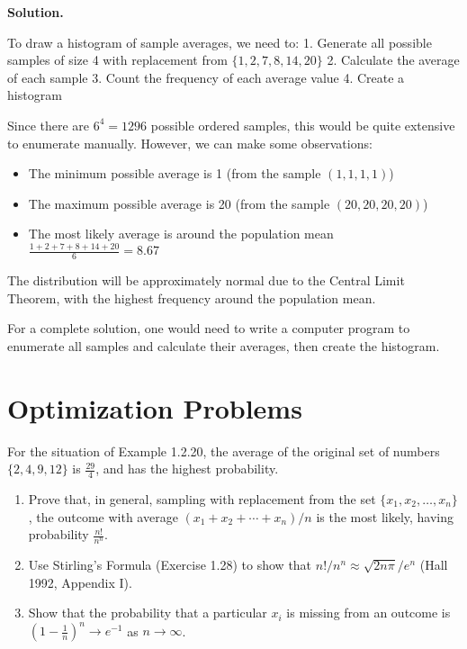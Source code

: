 \noindent\textbf{Solution.}

To draw a histogram of sample averages, we need to:
1. Generate all possible samples of size 4 with replacement from $\{1,2,7,8,14,20\}$
2. Calculate the average of each sample
3. Count the frequency of each average value
4. Create a histogram

Since there are $6^4 = 1296$ possible ordered samples, this would be quite extensive to enumerate manually. However, we can make some observations:

\begin{itemize}
\item The minimum possible average is 1 (from the sample $(1,1,1,1)$)
\item The maximum possible average is 20 (from the sample $(20,20,20,20)$)
\item The most likely average is around the population mean $\frac{1+2+7+8+14+20}{6} = 8.67$
\end{itemize}

The distribution will be approximately normal due to the Central Limit Theorem, with the highest frequency around the population mean.

For a complete solution, one would need to write a computer program to enumerate all samples and calculate their averages, then create the histogram.


\section{Optimization Problems}

\begin{problembox}
For the situation of Example 1.2.20, the average of the original set of numbers $\{2,4,9,12\}$ is $\frac{29}{4}$, and has the highest probability.
\begin{enumerate}[label=(\alph*)]
    \item Prove that, in general, sampling with replacement from the set $\{x_{1},x_{2},\ldots,x_{n}\}$, the outcome with average $(x_{1}+x_{2}+\cdots+x_{n})/n$ is the most likely, having probability $\frac{n!}{n^{n}}$.
    \item Use Stirling's Formula (Exercise 1.28) to show that $n!/n^{n}\approx\sqrt{2n\pi}/e^{n}$ (Hall 1992, Appendix I).
    \item Show that the probability that a particular $x_{i}$ is missing from an outcome is $(1-\frac{1}{n})^{n}\to e^{-1}$ as $n\to\infty$.
\end{enumerate}
\end{problembox}

